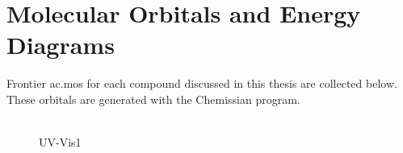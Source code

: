 \chapter{Molecular Orbitals and Energy Diagrams} \label{chap.mos}

Frontier \glspl{ac.mo} for each compound discussed in this thesis are collected below. These orbitals are generated with the Chemissian program\autocite{chemissian}.


\begin{figure}[!htbp]
 \begin{center}
  \includegraphics[clip=true]{images/insertgraphic.eps}
 \end{center}
\caption{UV-Vis1}
\label{fig.uvvis1}
\end{figure}

